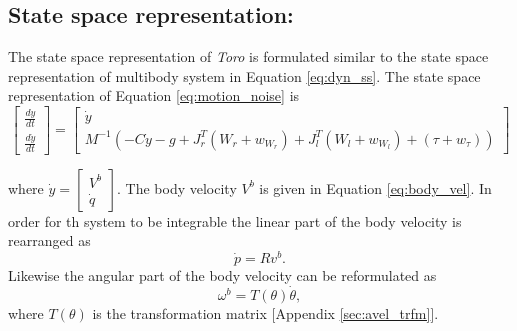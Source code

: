 \subsection{State space representation:}
The state space representation of \emph{Toro} is formulated similar to the state space representation of multibody system in Equation \ref{eq:dyn_ss}. The state space representation of Equation \ref{eq:motion_noise} is
\begin{equation}
\label{eq:newton_motion}
 \begin{bmatrix}
\frac{dy}{dt} \\ \frac{d\dot y}{dt}
\end{bmatrix}
= \begin{bmatrix}
\dot y \\  M^{-1}(-C\dot{y} - g + J_r^{T}(W_{r}+w_{W_r}) +J_l^{T}(W_{l}+w_{W_l}) + (\tau+w_\tau)) 
\end{bmatrix}
\end{equation}

where $\dot y = \begin{bmatrix} V^b \\ \dot q \end{bmatrix}$. The body velocity $V^b$ is given in Equation \ref{eq:body_vel}. In order for th system to be integrable the linear part of the body velocity is rearranged as 
\begin{equation}
    \label{eq:transfo_linvel}
    \dot p = R v^b.
\end{equation}
Likewise the angular part of the body velocity can be reformulated as 
\begin{equation}
    \label{eq:transfo_angvel}
    \omega^b = T(\theta)\dot{\theta},
\end{equation}
where $T(\theta)$ is the transformation matrix [Appendix \ref{sec:avel_trfm}]. 

